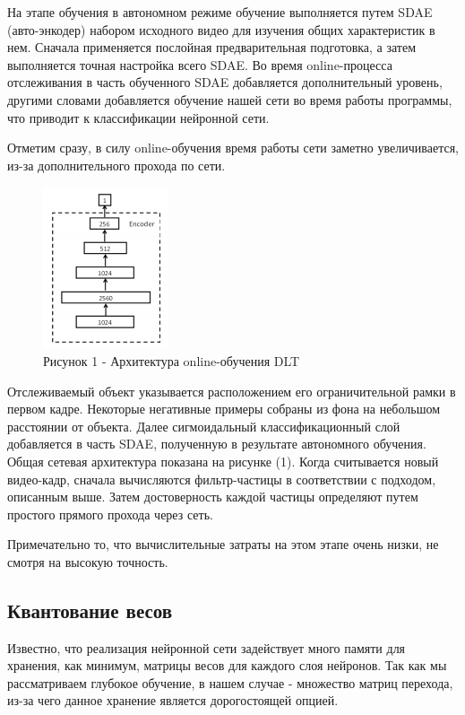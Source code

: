 \documentclass[14pt, a4paper]{article}
\begin{document}
 На этапе обучения в автономном режиме обучение  выполняется путем SDAE (авто-энкодер) набором исходного видео для изучения общих характеристик в нем. 
 Сначала применяется послойная предварительная подготовка, а затем выполняется точная настройка всего SDAE. Во время online-процесса отслеживания в часть обученного SDAE добавляется дополнительный уровень, другими словами добавляется обучение нашей сети во время работы программы, что приводит к классификации нейронной сети. 
 
 Отметим сразу, в силу online-обучения время работы сети заметно увеличивается, из-за дополнительного прохода по сети.
 
 \begin{figure}[h]\label{arh}
    \centering
    \includegraphics{online.PNG}
    \caption*{Рисунок 1 - Архитектура online-обучения DLT}
\end{figure}

 Отслеживаемый объект указывается расположением его ограничительной рамки в первом кадре. Некоторые негативные примеры собраны из фона на небольшом расстоянии от объекта. Далее сигмоидальный классификационный слой добавляется в часть SDAE, полученную в результате автономного обучения. Общая сетевая архитектура показана на рисунке (1). Когда считывается новый видео-кадр, сначала вычисляются фильтр-частицы в соответствии с подходом, описанным выше. Затем достоверность каждой частицы определяют путем простого прямого прохода через сеть. 
 
 Примечательно то, что вычислительные затраты на этом этапе очень низки, не смотря на высокую точность.

\subsection{Квантование весов}

Известно, что реализация нейронной сети задействует много памяти для хранения, как минимум, матрицы весов для каждого слоя нейронов. Так как мы рассматриваем глубокое обучение, в нашем случае - множество матриц перехода, из-за чего данное хранение является дорогостоящей опцией.
\end{document}

